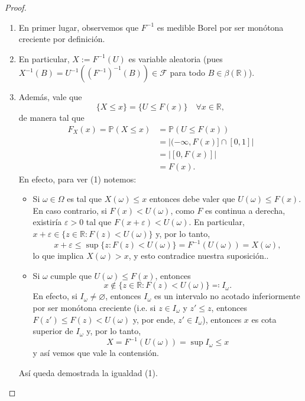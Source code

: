 \begin{proof}
    \begin{enumerate}
        \item En primer lugar, observemos que \(F^{-1}\) es medible Borel por ser monótona creciente por definición.

        \item En particular, \(X := F^{-1}(U)\) es variable aleatoria (pues \(X^{-1}(B) = U^{-1}((F^{-1})^{-1}(B)) \in \mathcal{F}\) para todo \(B \in \beta(\mathbb{R})\)).

        \item Además, vale que
        \[
        \{X \le x\} = \{U \le F(x)\} \quad \forall x \in \mathbb{R}, \tag{1}
        \]
        de manera tal que
		\begin{align*}
			F_X(x) = \mathbb{P}(X \le x) &= \mathbb{P}(U \le F(x)) \\
			&= |(-\infty, F(x)] \cap [0,1]| \\
			&= |[0, F(x)]| \\
			&= F(x).
		\end{align*}
        En efecto, para ver (1) notemos:
        \begin{itemize}
            \item[($\subseteq$)] Si \(\omega \in \Omega\) es tal que \(X(\omega) \le x\) entonces debe valer que \(U(\omega) \le F(x)\). En caso contrario, si \(F(x) < U(\omega)\), como \(F\) es continua a derecha, existiría \(\varepsilon > 0\) tal que \(F(x+\varepsilon) < U(\omega)\). En particular, \(x+\varepsilon \in \{z \in \mathbb{R} : F(z) < U(\omega)\}\) y, por lo tanto, 
			\[ x+\varepsilon \le \sup\{z : F(z) < U(\omega)\} = F^{-1}(U(\omega)) = X(\omega), \]
			lo que implica \(X(\omega) > x\), y esto contradice nuestra suposición..

            \item[($\supseteq$)] Si \(\omega\) cumple que \(U(\omega) \le F(x)\), entonces 
			\[ x \not\in \{z \in \mathbb{R} : F(z) < U(\omega)\} \eqcolon I_{\omega}. \]
			En efecto, si \(I_{\omega} \neq \varnothing\), entonces $I_{\omega}$ es un intervalo no acotado inferiormente por ser monótona creciente (i.e. si $z \in I_{\omega}$ y $z' \leq z$, entonces $F(z') \leq F(z) < U(\omega)$ y, por ende, $z' \in I_{\omega}$), entonces $x$ es cota superior de $I_{\omega}$ y, por lo tanto, 
			\[ X = F^{-1}(U(\omega)) = \sup I_{\omega} \leq x \]
			y así vemos que vale la contensión.
        \end{itemize}
        Así queda demostrada la igualdad (1).
    \end{enumerate}
\end{proof}

